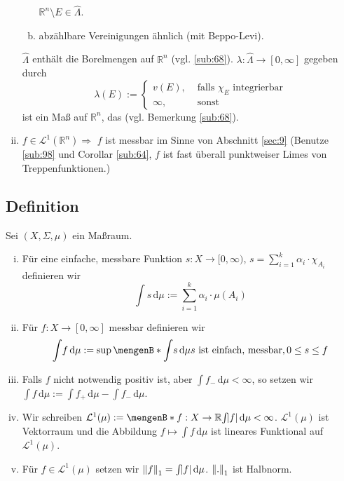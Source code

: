 \begin{enumerate}[(i)]
\begin{enumerate}[a)]
		$\mathds{R}^n \setminus E \in \hat \Lambda$.
		\item abzählbare Vereinigungen ähnlich (mit Beppo-Levi).
	\end{enumerate}
	$\hat \Lambda$ enthält die Borelmengen auf $\mathds{R}^n$ (vgl. \ref{sub:68}). $\lambda : \hat \Lambda \to [0,\infty]  $ gegeben durch 
	\[
		\lambda (E) := \begin{cases}
			v(E), &\text{ falls } \chi_E \text{ integrierbar}\\
			\infty, &\text{ sonst }
		\end{cases}
	\]
	ist ein Maß auf $\mathds{R}^n$, das   (vgl. Bemerkung \ref{sub:68}). 
	\item $f \in \mathcal{L}^1(\mathds{R}^n) \Rightarrow $ $f$ ist messbar im Sinne von Abschnitt \ref{sec:9}
	(Benutze \ref{sub:98} und Corollar \ref{sub:64}, $f$ ist fast überall punktweiser Limes von Treppenfunktionen.)
\end{enumerate}

\subsection[{Definition: Integrierbarkeit, $\norm[1]{.} $ in Maßräumen}]{Definition} %
\label{sub:917}
Sei $(X,\Sigma, \mu)$ ein Maßraum. 
\begin{enumerate}[(i)]
	\item Für eine einfache, messbare Funktion $s : X \to [0,\infty)$, $s = \sum_{i=1}^{k} \alpha_i \cdot \chi_{A_i}$ definieren wir
	\[
		\int\! s  \, \mathrm{d}\mu := \sum_{i=1}^{k} \alpha_i \cdot \mu(A_i)
	\]
	\item Für $f : X \to [0,\infty]$ messbar definieren wir 
	\[
		\int\! f  \, \mathrm{d}\mu := \sup \set[\int\! s  \, \mathrm{d}\mu]{s \text{ ist einfach, messbar}, 0 \le s \le f} 
	\]
	\item Falls $f$ nicht notwendig positiv ist, aber $\int\! f_-  \, \mathrm{d}\mu < \infty$, so setzen wir $\int\! f  \, \mathrm{d}\mu := \int\! f_+  \, \mathrm{d}\mu -
	\int\! f_-  \, \mathrm{d}\mu $.
	\item Wir schreiben $\mathcal{L}^1(\mu) := \set[f : X \to \mathds{R}]{\int\! \abs{f}  \, \mathrm{d}\mu < \infty }$. $\mathcal{L}^1(\mu)$ ist Vektorraum und die
	Abbildung $f \mapsto\int\! f  \, \mathrm{d}\mu$ ist lineares Funktional auf $\mathcal{L}^1(\mu)$.
	\item Für $f \in \mathcal{L}^1(\mu)$ setzen wir $\norm[1]{f} = \int\! \abs{f}  \, \mathrm{d}\mu$. $\norm[1]{.} $ ist Halbnorm.
\end{enumerate}

